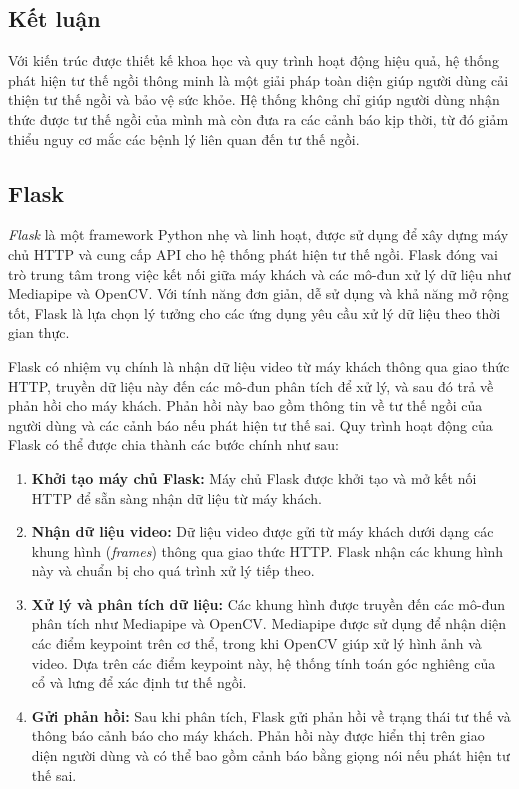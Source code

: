 \documentclass[conference]{IEEEtran}
\begin{document}
\subsection{Kết luận}
Với kiến trúc được thiết kế khoa học và quy trình hoạt động hiệu quả, hệ thống phát hiện tư thế ngồi thông minh là một giải pháp toàn diện giúp người dùng cải thiện tư thế ngồi và bảo vệ sức khỏe. Hệ thống không chỉ giúp người dùng nhận thức được tư thế ngồi của mình mà còn đưa ra các cảnh báo kịp thời, từ đó giảm thiểu nguy cơ mắc các bệnh lý liên quan đến tư thế ngồi.

\subsection{Flask}
\textit{Flask} là một framework Python nhẹ và linh hoạt, được sử dụng để xây dựng máy chủ HTTP và cung cấp API cho hệ thống phát hiện tư thế ngồi. Flask đóng vai trò trung tâm trong việc kết nối giữa máy khách và các mô-đun xử lý dữ liệu như Mediapipe và OpenCV. Với tính năng đơn giản, dễ sử dụng và khả năng mở rộng tốt, Flask là lựa chọn lý tưởng cho các ứng dụng yêu cầu xử lý dữ liệu theo thời gian thực.

Flask có nhiệm vụ chính là nhận dữ liệu video từ máy khách thông qua giao thức HTTP, truyền dữ liệu này đến các mô-đun phân tích để xử lý, và sau đó trả về phản hồi cho máy khách. Phản hồi này bao gồm thông tin về tư thế ngồi của người dùng và các cảnh báo nếu phát hiện tư thế sai. Quy trình hoạt động của Flask có thể được chia thành các bước chính như sau:

\begin{enumerate}
    \item \textbf{Khởi tạo máy chủ Flask:} Máy chủ Flask được khởi tạo và mở kết nối HTTP để sẵn sàng nhận dữ liệu từ máy khách.
    \item \textbf{Nhận dữ liệu video:} Dữ liệu video được gửi từ máy khách dưới dạng các khung hình (\textit{frames}) thông qua giao thức HTTP. Flask nhận các khung hình này và chuẩn bị cho quá trình xử lý tiếp theo.
    \item \textbf{Xử lý và phân tích dữ liệu:} Các khung hình được truyền đến các mô-đun phân tích như Mediapipe và OpenCV. Mediapipe được sử dụng để nhận diện các điểm keypoint trên cơ thể, trong khi OpenCV giúp xử lý hình ảnh và video. Dựa trên các điểm keypoint này, hệ thống tính toán góc nghiêng của cổ và lưng để xác định tư thế ngồi.
    \item \textbf{Gửi phản hồi:} Sau khi phân tích, Flask gửi phản hồi về trạng thái tư thế và thông báo cảnh báo cho máy khách. Phản hồi này được hiển thị trên giao diện người dùng và có thể bao gồm cảnh báo bằng giọng nói nếu phát hiện tư thế sai.
\end{enumerate}
\end{document}
